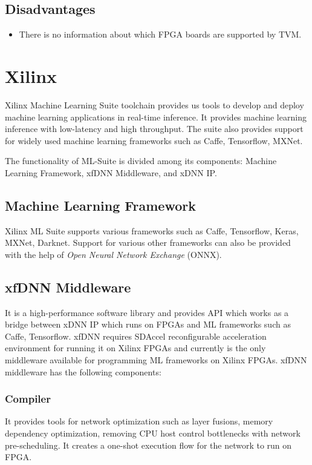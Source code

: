 \documentclass[titlepage]{report}
\begin{document}
 \subsection{Disadvantages}
 \begin{itemize}
 \item There is no information about which FPGA boards are supported by TVM.
 \end{itemize}

\section{Xilinx}
Xilinx Machine Learning Suite toolchain provides us tools to develop and deploy machine learning applications in real-time inference. It provides machine learning inference with low-latency and high throughput. The suite also provides support for widely used machine learning frameworks such as Caffe, Tensorflow, MXNet.

The functionality of ML-Suite is divided among its components: Machine Learning Framework, xfDNN Middleware, and xDNN IP.

\subsection{Machine Learning Framework}
Xilinx ML Suite supports various frameworks such as Caffe, Tensorflow, Keras, MXNet, Darknet. Support for various other frameworks can also be provided with the help of \textit{Open Neural Network Exchange} (ONNX).

\subsection{xfDNN Middleware}
It is a high-performance software library and provides API which works as a bridge between xDNN IP which runs on FPGAs and ML frameworks such as Caffe, Tensorflow. xfDNN requires SDAccel reconfigurable acceleration environment for running it on Xilinx FPGAs and currently is the only middleware available for programming ML frameworks on Xilinx FPGAs. xfDNN middleware has the following components:
\subsubsection{Compiler}

It provides tools for network optimization such as layer fusions, memory dependency optimization, removing CPU host control bottlenecks with network pre-scheduling. It creates a one-shot execution flow for the network to run on FPGA.
\end{document}
